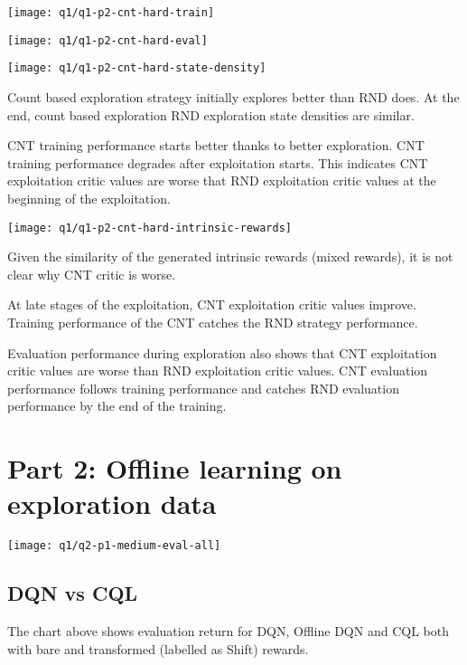 \documentclass[11pt]{article}
\begin{document}
    \hspace*{-0.6in}
    \texttt{[image: q1/q1-p2-cnt-hard-train]}

    \hspace*{-0.6in}
    \texttt{[image: q1/q1-p2-cnt-hard-eval]}

    \hspace*{-0.6in}
    \texttt{[image: q1/q1-p2-cnt-hard-state-density]}

    Count based exploration strategy initially explores better than RND does.
    At the end, count based exploration RND exploration state densities are similar.

    CNT training performance starts better thanks to better exploration.
    CNT training performance degrades after exploitation starts.
    This indicates CNT exploitation critic values are worse that RND exploitation critic values at the beginning of the exploitation.

    \hspace*{-0.6in}
    \texttt{[image: q1/q1-p2-cnt-hard-intrinsic-rewards]}

    Given the similarity of the generated intrinsic rewards (mixed rewards), it is not clear why CNT critic is worse.

    At late stages of the exploitation, CNT exploitation critic values improve.
    Training performance of the CNT catches the RND strategy performance.

    Evaluation performance during exploration also shows that CNT exploitation critic values are worse than RND exploitation critic values.
    CNT evaluation performance follows training performance and catches RND evaluation performance by the end of the training.


    \section*{Part 2: Offline learning on exploration data}

    \hspace*{-0.6in}
    \texttt{[image: q1/q2-p1-medium-eval-all]}

    \subsection*{DQN vs CQL}

    The chart above shows evaluation return for DQN, Offline DQN and CQL both with bare and transformed (labelled as Shift) rewards.
\end{document}
